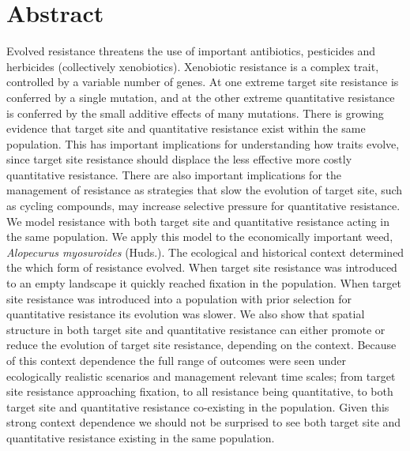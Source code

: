 \documentclass[10pt,letterpaper]{article}
\begin{document}
\section*{Abstract}
Evolved resistance threatens the use of important antibiotics, pesticides and herbicides (collectively xenobiotics). Xenobiotic resistance is a complex trait, controlled by a variable number of genes. At one extreme target site resistance is conferred by a single mutation, and at the other extreme quantitative resistance is conferred by the small additive effects of many mutations. There is growing evidence that target site and quantitative resistance exist within the same population. This has important implications for understanding how traits evolve, since target site resistance should displace the less effective more costly quantitative resistance. There are also important implications for the management of resistance as strategies that slow the evolution of target site, such as cycling compounds, may increase selective pressure for quantitative resistance. We model resistance with both target site and quantitative resistance acting in the same population. We apply this model to the economically important weed, \textit{Alopecurus myosuroides} (Huds.). The ecological and historical context determined the which form of resistance evolved. When target site resistance was introduced to an empty landscape it quickly reached fixation in the population. When target site resistance was introduced into a population with prior selection for quantitative resistance its evolution was slower. We also show that spatial structure in both target site and quantitative resistance can either promote or reduce the evolution of target site resistance, depending on the context. Because of this context dependence the full range of outcomes were seen under ecologically realistic scenarios and management relevant time scales; from target site resistance approaching fixation, to all resistance being quantitative, to both target site and quantitative resistance co-existing in the population. Given this strong context dependence we should not be surprised to see both target site and quantitative resistance existing in the same population.     

\end{document}
